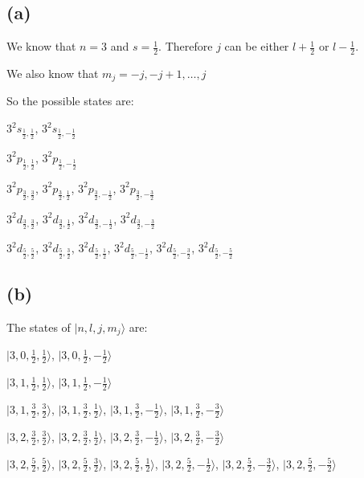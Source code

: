 \documentclass[12pt]{article}
\begin{document}
\begin{spacing}{2.0}
\subsection*{(a)}

We know that $n=3$ and $s=\frac{1}{2}$. Therefore $j$ can be either $l+\frac{1}{2}$ or $l-\frac{1}{2}$.

We also know that $m_j=-j,-j+1, \ldots, j $

So the possible states are:

$3^2s_{\frac{1}{2},\frac{1}{2}}$, $3^2s_{\frac{1}{2},-\frac{1}{2}}$

$3^2p_{\frac{1}{2},\frac{1}{2}}$, $3^2p_{\frac{1}{2},-\frac{1}{2}}$

$3^2p_{\frac{3}{2},\frac{3}{2}}$, $3^2p_{\frac{3}{2},\frac{1}{2}}$, $3^2p_{\frac{3}{2},-\frac{1}{2}}$, $3^2p_{\frac{3}{2},-\frac{3}{2}}$

$3^2d_{\frac{3}{2},\frac{3}{2}}$, $3^2d_{\frac{3}{2},\frac{1}{2}}$, $3^2d_{\frac{3}{2},-\frac{1}{2}}$, $3^2d_{\frac{3}{2},-\frac{3}{2}}$

$3^2d_{\frac{5}{2},\frac{5}{2}}$, $3^2d_{\frac{5}{2},\frac{3}{2}}$, $3^2d_{\frac{5}{2},\frac{1}{2}}$, $3^2d_{\frac{5}{2},-\frac{1}{2}}$, $3^2d_{\frac{5}{2},-\frac{3}{2}}$, $3^2d_{\frac{5}{2},-\frac{5}{2}}$

\subsection*{(b)}

The states of $|n,l,j,m_j \rangle$ are:

$|3,0,\frac{1}{2},\frac{1}{2} \rangle$, $|3,0,\frac{1}{2},-\frac{1}{2} \rangle$

$|3,1,\frac{1}{2},\frac{1}{2} \rangle$, $|3,1,\frac{1}{2},-\frac{1}{2} \rangle$

$|3,1,\frac{3}{2},\frac{3}{2} \rangle$, $|3,1,\frac{3}{2},\frac{1}{2} \rangle$, $|3,1,\frac{3}{2},-\frac{1}{2} \rangle$, $|3,1,\frac{3}{2},-\frac{3}{2} \rangle$

$|3,2,\frac{3}{2},\frac{3}{2} \rangle$, $|3,2,\frac{3}{2},\frac{1}{2} \rangle$, $|3,2,\frac{3}{2},-\frac{1}{2} \rangle$, $|3,2,\frac{3}{2},-\frac{3}{2} \rangle$

$|3,2,\frac{5}{2},\frac{5}{2} \rangle$, $|3,2,\frac{5}{2},\frac{3}{2} \rangle$, $|3,2,\frac{5}{2},\frac{1}{2} \rangle$, $|3,2,\frac{5}{2},-\frac{1}{2} \rangle$, $|3,2,\frac{5}{2},-\frac{3}{2} \rangle$, $|3,2,\frac{5}{2},-\frac{5}{2} \rangle$




\end{spacing}
\end{document}
